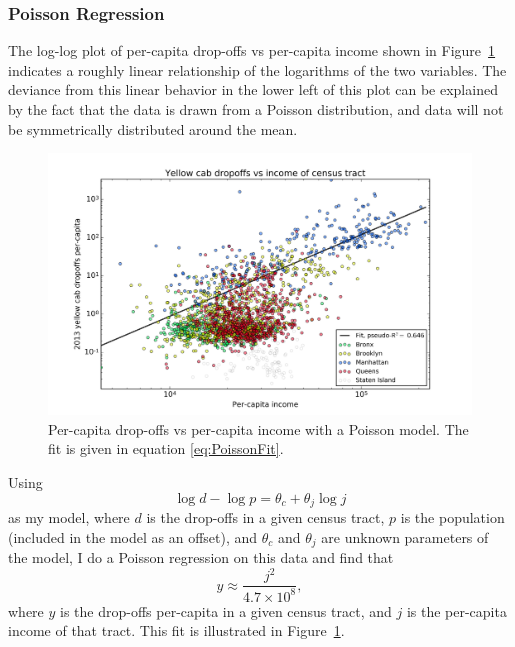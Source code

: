 \documentclass[11pt]{article}
\newcommand{\fref}[1]{Figure~\ref{fig:#1}}
\begin{document}
\subsubsection{Poisson Regression}



The log-log plot  of per-capita drop-offs vs per-capita income shown in \fref{dropoffsvsincome} indicates a roughly linear relationship of the logarithms of the two variables. The deviance from this linear behavior in the lower left of this plot can be explained by the fact that the data is drawn from a Poisson distribution, and data will not be symmetrically distributed around the mean.
\begin{figure}[h]
  \centering
  \includegraphics[width=\textwidth]{2013count_dropoffs_vs_income_low_car_poisson.png}
  \caption{Per-capita drop-offs vs per-capita income with a Poisson model. The fit is given in equation \ref{eq:PoissonFit}.\label{fig:dropoffsvsincome}}
\end{figure}
Using
\begin{equation}
  \log d - \log p = \theta_c + \theta_j \log j
\end{equation}
as my model, where $d$ is the drop-offs in a given census tract, $p$ is the population (included in the model as an offset), and $\theta_c$ and $\theta_j$ are unknown parameters of the model,
I do a Poisson regression on this data and find that 
\begin{equation}
  \label{eq:PoissonFit}
  y\approx \frac{j^2}{4.7\times 10^8},
\end{equation}
where $y$ is the drop-offs per-capita in a given census tract, and $j$ is the per-capita income of that tract.
This fit is illustrated in \fref{dropoffsvsincome}.
\end{document}
